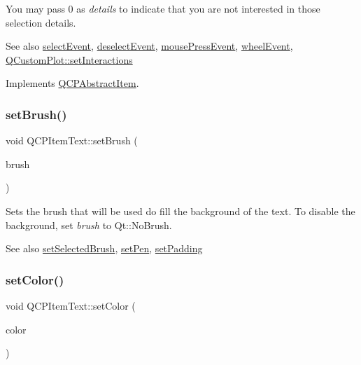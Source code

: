 You may pass 0 as {\itshape details} to indicate that you are not interested in those selection details.

\begin{DoxySeeAlso}{See also}
\mbox{\hyperlink{class_q_c_p_abstract_item_aa4b969c58797f39c9c0b6c07c7869d17}{select\+Event}}, \mbox{\hyperlink{class_q_c_p_abstract_item_af9093798cb07a861dcc73f93ca16c0c1}{deselect\+Event}}, \mbox{\hyperlink{class_q_c_p_layerable_af6567604818db90f4fd52822f8bc8376}{mouse\+Press\+Event}}, \mbox{\hyperlink{class_q_c_p_layerable_a47dfd7b8fd99c08ca54e09c362b6f022}{wheel\+Event}}, \mbox{\hyperlink{class_q_custom_plot_a5ee1e2f6ae27419deca53e75907c27e5}{Q\+Custom\+Plot\+::set\+Interactions}} 
\end{DoxySeeAlso}


Implements \mbox{\hyperlink{class_q_c_p_abstract_item_ae41d0349d68bb802c49104afd100ba2a}{Q\+C\+P\+Abstract\+Item}}.

\mbox{\label{class_q_c_p_item_text_a1c7e131516df2ed8d941ef31240ded8e}} 
\subsubsection{\texorpdfstring{setBrush()}{setBrush()}}
{\footnotesize\ttfamily void Q\+C\+P\+Item\+Text\+::set\+Brush (\begin{DoxyParamCaption}\item[{const Q\+Brush \&}]{brush }\end{DoxyParamCaption})}

Sets the brush that will be used do fill the background of the text. To disable the background, set {\itshape brush} to Qt\+::\+No\+Brush.

\begin{DoxySeeAlso}{See also}
\mbox{\hyperlink{class_q_c_p_item_text_a6b8377eeb2af75eb9528422671ac16cb}{set\+Selected\+Brush}}, \mbox{\hyperlink{class_q_c_p_item_text_a9b9ec6eea0eb0603977ff84d4c78d0a3}{set\+Pen}}, \mbox{\hyperlink{class_q_c_p_item_text_aeea8a3e01f135f9dd0bb08f51db66310}{set\+Padding}} 
\end{DoxySeeAlso}
\mbox{\label{class_q_c_p_item_text_aa51efc0841fe52da9eaf8aff6fc8a8b2}} 
\subsubsection{\texorpdfstring{setColor()}{setColor()}}
{\footnotesize\ttfamily void Q\+C\+P\+Item\+Text\+::set\+Color (\begin{DoxyParamCaption}\item[{const Q\+Color \&}]{color }\end{DoxyParamCaption})}

